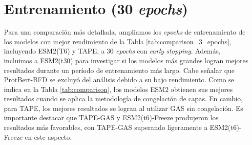\section{Entrenamiento (30 \textit{epochs})}

Para una comparación más detallada, ampliamos los \textit{epochs} de entrenamiento de los modelos con mejor rendimiento de la Tabla \ref{tab:comparison_3_epochs}, incluyendo ESM2(T6) y TAPE, a 30 \textit{epochs} con \textit{early stopping}. Además, incluimos a ESM2(t30) para investigar si los modelos más grandes logran mejores resultados durante un período de entrenamiento más largo. Cabe señalar que ProtBert-BFD se excluyó del análisis debido a su bajo rendimiento. Como se indica en la Tabla \ref{tab:comparison}, los modelos ESM2 obtienen sus mejores resultados cuando se aplica la metodología de congelación de capas. En cambio, para TAPE, los mejores resultados se logran al utilizar GAS sin congelación. Es importante destacar que TAPE-GAS y ESM2(t6)-Freeze produjeron los resultados más favorables, con TAPE-GAS superando ligeramente a ESM2(t6)-Freeze en este aspecto.

